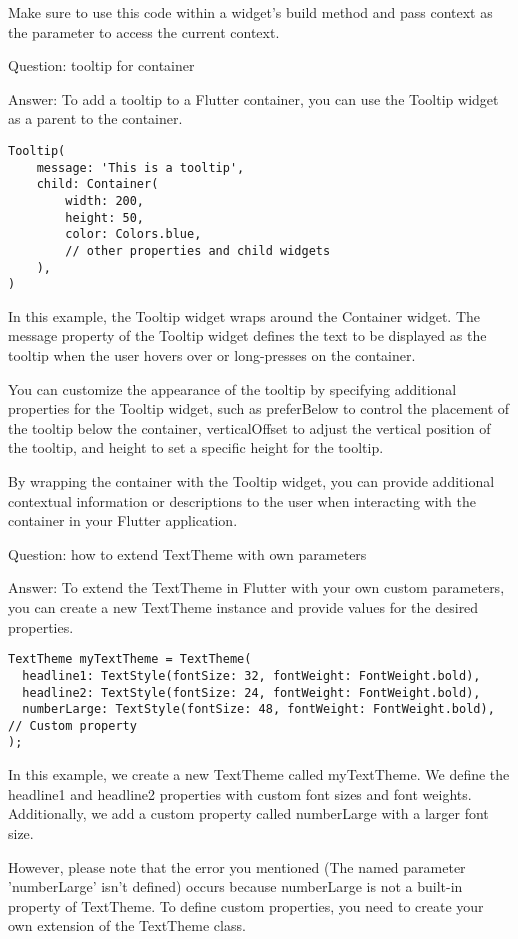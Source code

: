 Make sure to use this code within a widget's build method and pass context as the parameter to access the current 
context.

Question: tooltip for container

Answer: To add a tooltip to a Flutter container, you can use the Tooltip widget as a parent to the container. 

\begin{lstlisting}
Tooltip(
    message: 'This is a tooltip',
    child: Container(
        width: 200,
        height: 50,
        color: Colors.blue,
        // other properties and child widgets
    ),
)      
\end{lstlisting}

In this example, the Tooltip widget wraps around the Container widget. The message property of the Tooltip widget 
defines the text to be displayed as the tooltip when the user hovers over or long-presses on the container.

You can customize the appearance of the tooltip by specifying additional properties for the Tooltip widget, such 
as preferBelow to control the placement of the tooltip below the container, verticalOffset to adjust the vertical 
position of the tooltip, and height to set a specific height for the tooltip.

By wrapping the container with the Tooltip widget, you can provide additional contextual information or descriptions 
to the user when interacting with the container in your Flutter application.


Question: how to extend TextTheme with own parameters

Answer: To extend the TextTheme in Flutter with your own custom parameters, you can create a new TextTheme instance 
and provide values for the desired properties.

\begin{lstlisting}
TextTheme myTextTheme = TextTheme(
  headline1: TextStyle(fontSize: 32, fontWeight: FontWeight.bold),
  headline2: TextStyle(fontSize: 24, fontWeight: FontWeight.bold),
  numberLarge: TextStyle(fontSize: 48, fontWeight: FontWeight.bold), // Custom property
);
\end{lstlisting}

In this example, we create a new TextTheme called myTextTheme. We define the headline1 and headline2 properties with 
custom font sizes and font weights. Additionally, we add a custom property called numberLarge with a larger font size.

However, please note that the error you mentioned (The named parameter 'numberLarge' isn't defined) occurs because 
numberLarge is not a built-in property of TextTheme. To define custom properties, you need to create your own 
extension of the TextTheme class.

